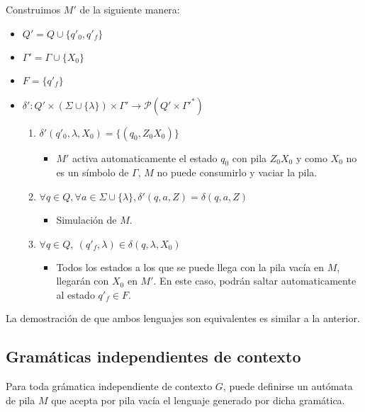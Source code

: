 \begin{demo}[0.8\textwidth]
  Construimos \(M'\) de la siguiente manera:
  \begin{itemize}
    \item \(Q' = Q \cup \{q'_0, q'_f\}\)
    \item \(\Gamma' = \Gamma\cup\{X_0\}\)
    \item \(F = \{ q'_f \} \)
    \item \(\delta': Q' \times (\Sigma \cup \{\lambda\}) \times \Gamma' \to \mathcal{P}(Q' \times \Gamma'^*)\)
          \begin{enumerate}
            \item \(\delta'(q'_0, \lambda, X_0) = \{(q_0, Z_0X_0)\} \)
                  \begin{itemize}
                    \item[] \(M'\) activa automaticamente el estado \(q_0\) con pila \(Z_0X_0\) y como \(X_0\) no es un símbolo de \(\Gamma\), \(M\) no puede consumirlo y vaciar la pila.
                  \end{itemize}
            \item \( \forall q\in Q, \forall a\in\Sigma\cup\{\lambda\},  \delta'(q, a, Z) = \delta(q, a, Z) \)
                  \begin{itemize}
                    \item[] Simulación de \(M\).
                  \end{itemize}
            \item \(\forall q\in Q,~(q'_f, \lambda) \in \delta(q,\lambda,X_0)\)
                  \begin{itemize}
                    \item[] Todos los estados a los que se puede llega con la pila vacía en \(M\), llegarán con \(X_0\) en  \(M'\). En este caso, podrán saltar automaticamente al estado \(q'_f\in F\).
                  \end{itemize}
          \end{enumerate}
  \end{itemize}

  La demostración de que ambos lenguajes son equivalentes es similar a la anterior.
\end{demo}

\subsection{Gramáticas independientes de contexto}

Para toda grámatica independiente de contexto \(G\), puede definirse un autómata de pila \(M\) que acepta por pila vacía el lenguaje generado por dicha gramática.

